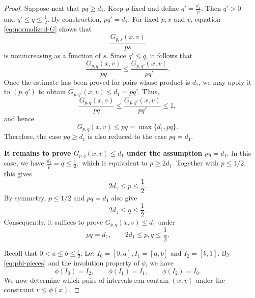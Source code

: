 \documentclass[11pt]{article}
\numberwithin{equation}{section}
\theoremstyle{definition}
\theoremstyle{remark}
\begin{document}
\begin{proof}
Suppose next that $pq\geq d_1$. Keep $p$ fixed and define
$
 q'=\frac{d_1}{p}.
$
Then $q'>0$ and
$
 q'\leq q\leq\frac12.
$
By construction,
$
 pq'=d_1.
$
For fixed $p,x$ and $v$, equation \eqref{eq:normalized-G} shows that
\begin{equation*}
 \frac{G_{p,s}(x,v)}{ps}
\end{equation*}
is nonincreasing as a function of $s$. Since $q'\leq q$, it follows
that
\begin{equation*}
 \frac{G_{p,q}(x,v)}{pq}
 \leq
 \frac{G_{p,q'}(x,v)}{pq'}.
\end{equation*}
Once the estimate has been proved for pairs whose product is $d_1$, we
may apply it to $(p,q')$ to obtain
$
 G_{p,q'}(x,v)\leq d_1=pq'.
$
Thus,
\begin{equation*}
 \frac{G_{p,q}(x,v)}{pq}
 \leq
 \frac{G_{p,q'}(x,v)}{pq'}
 \leq1,
\end{equation*}
and hence
\begin{equation*}
 G_{p,q}(x,v)
 \leq pq
 =
 \max\{d_1,pq\}.
\end{equation*}
Therefore, the case $pq\geq d_1$ is also reduced to the case $pq=d_1$.


















\textbf{It remains to prove
$
 G_{p,q}(x,v)\leq d_1
$
under the assumption
$
 pq=d_1.
$}
In this case, we have
$
 \frac{d_1}{p}=q\leq\frac12,
$
which is equivalent to
$
 p\geq2d_1.
$
Together with $p\leq1/2$, this gives
\begin{equation*}
 2d_1\leq p\leq\frac12.
\end{equation*}
By symmetry, $p\leq1/2$ and $pq=d_1$ also give
\begin{equation*}
 2d_1\leq q\leq\frac12.
\end{equation*}
Consequently, it suffices to prove $
 G_{p,q}(x,v)\leq d_1
$ under
\begin{equation*}
 pq=d_1,
 \qquad
 2d_1\leq p,q\leq\frac12.
\end{equation*}



Recall that $0<a\leq b\leq\frac12$.
Let
$
 I_0=[0,a],
 I_1=[a,b]
$
and
$
 I_2=[b,1].
$
By \eqref{eq:phi-pieces} and the involution property of $\phi$, we have
\begin{equation*}
 \phi(I_0)=I_2,
 \qquad
 \phi(I_1)=I_1,
 \qquad
 \phi(I_2)=I_0.
\end{equation*}
We now determine which pairs of intervals can contain $(x,v)$ under
the constraint $v\leq\phi(x)$.


\end{proof}
\end{document}
